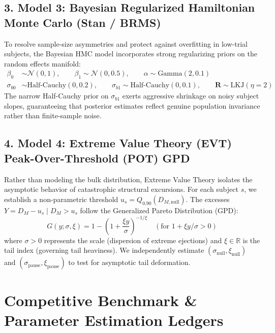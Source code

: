 \documentclass[11pt,twoside,a4paper]{article}
\begin{document}
\subsection{3. Model 3: Bayesian Regularized Hamiltonian Monte Carlo (Stan / BRMS)}
To resolve sample-size asymmetries and protect against overfitting in low-trial subjects, the Bayesian HMC model incorporates strong regularizing priors on the random effects manifold:
\begin{align}
\beta_0 &\sim \mathcal{N}(0, 1), \qquad \beta_1 \sim \mathcal{N}(0, 0.5), \qquad \alpha \sim \text{Gamma}(2, 0.1) \\
\sigma_{b0} &\sim \text{Half-Cauchy}(0, 0.2), \qquad \sigma_{b1} \sim \text{Half-Cauchy}(0, 0.1), \qquad \mathbf{R} \sim \text{LKJ}(\eta = 2)
\end{align}
The narrow Half-Cauchy prior on $\sigma_{b1}$ exerts aggressive shrinkage on noisy subject slopes, guaranteeing that posterior estimates reflect genuine population invariance rather than finite-sample noise.

\subsection{4. Model 4: Extreme Value Theory (EVT) Peak-Over-Threshold (POT) GPD}
Rather than modeling the bulk distribution, Extreme Value Theory isolates the asymptotic behavior of catastrophic structural excursions. For each subject $s$, we establish a non-parametric threshold $u_s = Q_{0.90}(D_{M, \text{null}})$. The excesses $Y = D_M - u_s \mid D_M > u_s$ follow the Generalized Pareto Distribution (GPD):
\begin{equation}
G(y; \sigma, \xi) = 1 - \left( 1 + \frac{\xi y}{\sigma} \right)^{-1/\xi} \quad (\text{for } 1 + \xi y / \sigma > 0)
\end{equation}
where $\sigma > 0$ represents the scale (dispersion of extreme ejections) and $\xi \in \mathbb{R}$ is the tail index (governing tail heaviness). We independently estimate $(\sigma_{\text{null}}, \xi_{\text{null}})$ and $(\sigma_{\text{pause}}, \xi_{\text{pause}})$ to test for asymptotic tail deformation.

\newpage

\section{Competitive Benchmark \& Parameter Estimation Ledgers}
\end{document}
